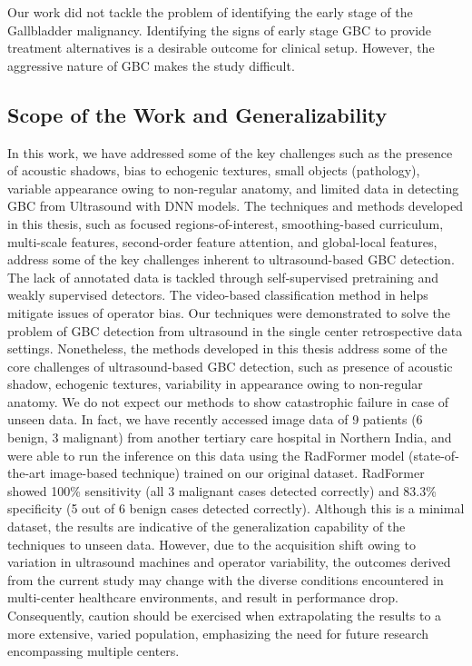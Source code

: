 %
Our work did not tackle the problem of identifying the early stage of the Gallbladder malignancy. Identifying the signs of early stage GBC to provide treatment alternatives is a desirable outcome for clinical setup. However, the aggressive nature of GBC makes the study difficult. 

\subsection{Scope of the Work and Generalizability}
In this work, we have addressed some of the key challenges such as the presence of acoustic shadows, bias to echogenic textures, small objects (pathology), variable appearance owing to non-regular anatomy, and limited data in detecting GBC from Ultrasound with DNN models. The techniques and methods developed in this thesis, such as focused regions-of-interest, smoothing-based curriculum, multi-scale features, second-order feature attention, and global-local features, address some of the key challenges inherent to ultrasound-based GBC detection. The lack of annotated data is tackled through self-supervised pretraining and weakly supervised detectors. The video-based classification method in  helps mitigate issues of operator bias.  Our techniques were demonstrated to solve the problem of GBC detection from ultrasound in the single center retrospective data settings. Nonetheless, the methods developed in this thesis address some of the core challenges of ultrasound-based GBC detection, such as presence of acoustic shadow, echogenic textures, variability in appearance owing to non-regular anatomy. We do not expect our methods to show catastrophic failure in case of unseen data. In fact, we have recently accessed image data of 9 patients (6 benign, 3 malignant) from another tertiary care hospital in Northern India, and were able to run the inference on this data using the RadFormer model (state-of-the-art image-based technique) trained on our original dataset. RadFormer showed 100\% sensitivity (all 3 malignant cases detected correctly) and 83.3\% specificity (5 out of 6 benign cases detected correctly). Although this is a minimal dataset, the results are indicative of the generalization capability of the techniques to unseen data. However, due to the acquisition shift owing to variation in ultrasound machines and operator variability, the outcomes derived from the current study may change with the diverse conditions encountered in multi-center healthcare environments, and result in performance drop. Consequently, caution should be exercised when extrapolating the results to a more extensive, varied population, emphasizing the need for future research encompassing multiple centers.%


